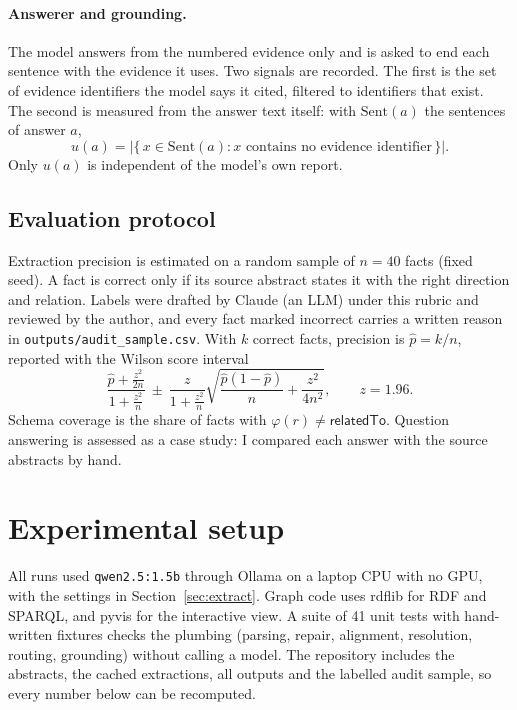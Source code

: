 \documentclass[11pt]{article}
\newcommand{\code}[1]{\texttt{#1}}
\newcommand{\prop}[1]{\textsf{#1}}
\begin{document}
\paragraph{Answerer and grounding.} The model answers from the numbered evidence only and is asked to end each sentence with the evidence it uses. Two signals are recorded. The first is the set of evidence identifiers the model says it cited, filtered to identifiers that exist. The second is measured from the answer text itself: with $\mathrm{Sent}(a)$ the sentences of answer $a$,
\begin{equation}
  u(a) = \big|\{\, x \in \mathrm{Sent}(a) : x \text{ contains no evidence identifier} \,\}\big| .
\end{equation}
Only $u(a)$ is independent of the model's own report.

\subsection{Evaluation protocol}
Extraction precision is estimated on a random sample of $n=40$ facts (fixed seed). A fact is correct only if its source abstract states it with the right direction and relation. Labels were drafted by Claude (an LLM) under this rubric and reviewed by the author, and every fact marked incorrect carries a written reason in \code{outputs/audit\_sample.csv}. With $k$ correct facts, precision is $\hat{p}=k/n$, reported with the Wilson score interval
\begin{equation}
  \frac{\hat{p} + \frac{z^2}{2n}}{1+\frac{z^2}{n}} \ \pm\ \frac{z}{1+\frac{z^2}{n}}\sqrt{\frac{\hat{p}(1-\hat{p})}{n} + \frac{z^2}{4n^2}},\qquad z = 1.96 .
\end{equation}
Schema coverage is the share of facts with $\varphi(r)\neq\prop{relatedTo}$. Question answering is assessed as a case study: I compared each answer with the source abstracts by hand.

\section{Experimental setup}
All runs used \code{qwen2.5:1.5b} \cite{qwen2024qwen25} through Ollama \cite{ollama} on a laptop CPU with no GPU, with the settings in Section~\ref{sec:extract}. Graph code uses rdflib for RDF and SPARQL, and pyvis for the interactive view. A suite of 41 unit tests with hand-written fixtures checks the plumbing (parsing, repair, alignment, resolution, routing, grounding) without calling a model. The repository includes the abstracts, the cached extractions, all outputs and the labelled audit sample, so every number below can be recomputed.
\end{document}
